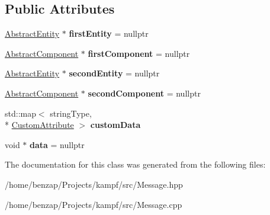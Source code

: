 \subsection*{Public Attributes}
\begin{DoxyCompactItemize}
\item 
\hypertarget{classMessage_a4141a55fa244e6d94a0e0c3d85fcb745}{\hyperlink{classAbstractEntity}{Abstract\-Entity} $\ast$ {\bfseries first\-Entity} = nullptr}\label{classMessage_a4141a55fa244e6d94a0e0c3d85fcb745}

\item 
\hypertarget{classMessage_ab3e4cfe98f806d7ce2d192702a85df77}{\hyperlink{classAbstractComponent}{Abstract\-Component} $\ast$ {\bfseries first\-Component} = nullptr}\label{classMessage_ab3e4cfe98f806d7ce2d192702a85df77}

\item 
\hypertarget{classMessage_aeab6a9213506c5982eaf3bb43ab11928}{\hyperlink{classAbstractEntity}{Abstract\-Entity} $\ast$ {\bfseries second\-Entity} = nullptr}\label{classMessage_aeab6a9213506c5982eaf3bb43ab11928}

\item 
\hypertarget{classMessage_aa2c2cc4ec65dccc53d2b763b0e4a925c}{\hyperlink{classAbstractComponent}{Abstract\-Component} $\ast$ {\bfseries second\-Component} = nullptr}\label{classMessage_aa2c2cc4ec65dccc53d2b763b0e4a925c}

\item 
\hypertarget{classMessage_ad82cda1b8623d92f71d0b39762a25eaa}{std\-::map$<$ string\-Type, \\*
\hyperlink{classCustomAttribute}{Custom\-Attribute} $>$ {\bfseries custom\-Data}}\label{classMessage_ad82cda1b8623d92f71d0b39762a25eaa}

\item 
\hypertarget{classMessage_a80da5bb5a9e767f288dd70652a526617}{void $\ast$ {\bfseries data} = nullptr}\label{classMessage_a80da5bb5a9e767f288dd70652a526617}

\end{DoxyCompactItemize}


The documentation for this class was generated from the following files\-:\begin{DoxyCompactItemize}
\item 
/home/benzap/\-Projects/kampf/src/Message.\-hpp\item 
/home/benzap/\-Projects/kampf/src/Message.\-cpp\end{DoxyCompactItemize}
